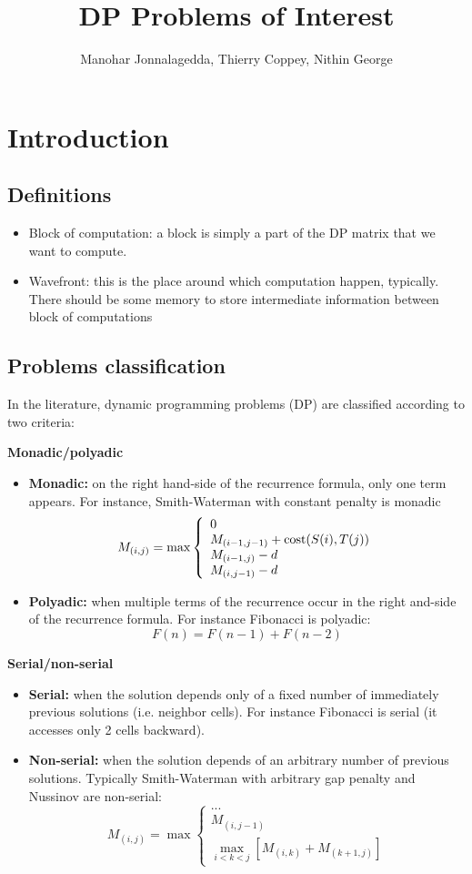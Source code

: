 \documentclass[11pt]{article}
\title{DP Problems of Interest}
\author{Manohar Jonnalagedda, Thierry Coppey, Nithin George}
\date{}
\def\ul{\begin{itemize}}
\def\ule{\end{itemize}}
\begin{document}
\maketitle
\pagestyle{headings}

\section{Introduction}
\subsection{Definitions}\ul
\item Block of computation: a block is simply a part of the DP matrix that we want to compute.
\item Wavefront: this is the place around which computation happen, typically. There should be some memory to store intermediate information between block of computations
\ule

\subsection{Problems classification}
In the literature, dynamic programming problems (DP) are classified according to two criteria:

\textbf{Monadic/polyadic}\ul
\item \textbf{Monadic:} on the right hand-side of the recurrence formula, only one term appears. For instance, Smith-Waterman with constant penalty is monadic
	\[M_{(i,j)}=\max\left\{\begin{array}{l} 0 \\ M_{(i-1,j-1)}+{\rm cost}(S(i),T(j))\\ M_{(i-1,j)}-d\\ M_{(i,j-1)}-d \end{array}\right. \]
\item \textbf{Polyadic:} when multiple terms of the recurrence occur in the right and-side of the recurrence formula. For instance Fibonacci is polyadic: \[F(n) = F(n-1) + F(n-2)\]
\ule

\textbf{Serial/non-serial} \ul
\item \textbf{Serial:} when the solution depends only of a fixed number of immediately previous solutions (i.e. neighbor cells). For instance Fibonacci is serial (it accesses only 2 cells backward).
\item \textbf{Non-serial:} when the solution depends of an arbitrary number of previous solutions. Typically Smith-Waterman with arbitrary gap penalty and Nussinov are non-serial:
	\[M_{(i,j)}=\max\left\{\begin{array}{l} ... \\ M_{(i,j-1)}\\ \max\limits_{i<k<j} [ M_{(i,k)}+M_{(k+1,j)} ] \end{array}\right. \]
\ule
\end{document}
